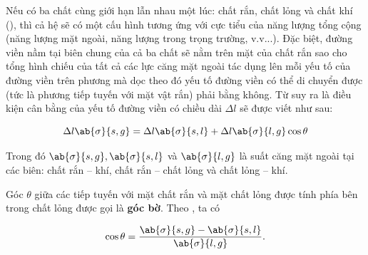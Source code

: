 
Nếu có ba chất cùng giới hạn lẫn nhau một lúc: chất rắn, chất lỏng và chất khí (), thì cả hệ sẽ có một cấu hình tương ứng với cực tiểu của năng lượng tổng cộng (năng lượng mặt ngoài, năng lượng trong trọng trường, v.v...). Đặc biệt, đường viền nầm tại biên chung của cả ba chất sẽ nằm trên mặt của chất rắn sao cho tổng hình chiếu của tất cả các lực căng mặt ngoài tác dụng lên mỗi yếu tố của đường viền trên phương mà dọc theo đó yếu tố đường viền có thể di chuyển được (tức là phương tiếp tuyến với mặt vật rắn) phải bằng không. Từ  suy ra là điều kiện cân bằng của yếu tố đường viền có chiều dài $\Delta l$ sẽ được viết như sau:

\begin{equation}\label{eq:14_5}
	\Delta l \ab{\sigma}{s,g} = \Delta l \ab{\sigma}{s,l} + \Delta l \ab{\sigma}{l,g}\cos\theta
\end{equation}

\noindent

Trong đó $\ab{\sigma}{s,g}, \ab{\sigma}{s,l}$ và $\ab{\sigma}{l,g}$ là suất căng mặt ngoài tại các  biên: chất rắn -- khí, chất rắn -- chất lỏng và chất lỏng -- khí.


Góc $\theta$ giữa các tiếp tuyến với mặt chất rắn và mặt chất lỏng được tính phía bên trong chất lỏng được gọi là \textbf{góc bờ}. Theo , ta có

\begin{equation}\label{eq:14_6}
	\cos\theta = \frac{\ab{\sigma}{s,g} - \ab{\sigma}{s,l}}{\ab{\sigma}{l,g}}.
\end{equation}

